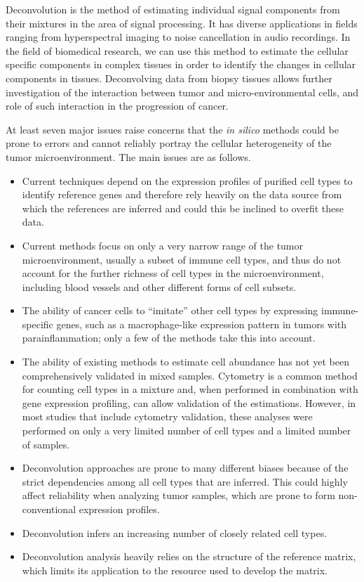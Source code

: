 \documentclass{article}
\begin{document}
Deconvolution is the method of estimating individual signal components from their mixtures in the area of signal processing. It has diverse applications in fields ranging from hyperspectral imaging to noise cancellation in audio recordings. In the field of biomedical research, we can use this method to estimate the cellular specific components in complex tissues in order to identify the changes in cellular components in tissues. Deconvolving data from biopsy tissues allows further investigation of the interaction between tumor and micro-environmental cells, and role of such interaction in the progression of cancer.

At least seven major issues raise concerns that the \textit{in silico} methods could be prone to errors and cannot reliably portray the cellular heterogeneity of the tumor microenvironment. The main issues are as follows.
\begin{itemize}
    \item Current techniques depend on the expression profiles of purified cell types to identify reference genes and therefore rely heavily on the data source from which the references are inferred and could this be inclined to overfit these data. 
     \item Current methods focus on only a very narrow range of the tumor microenvironment, usually a subset of immune cell types, and thus do not account for the further richness of cell types in the microenvironment, including blood vessels and other different forms of cell subsets.
      \item The ability of cancer cells to “imitate” other cell types by expressing immune-specific genes, such as a macrophage-like expression pattern in tumors with parainflammation; only a few of the methods take this into account. 
       \item The ability of existing methods to estimate cell abundance has not yet been comprehensively validated in mixed samples. Cytometry is a common method for counting cell types in a mixture and, when performed in combination with gene expression profiling, can allow validation of the estimations. However, in most studies that include cytometry validation, these analyses were performed on only a very limited number of cell types and a limited number of samples. 
        \item Deconvolution approaches are prone to many different biases because of the strict dependencies among all cell types that are inferred. This could highly affect reliability when analyzing tumor samples, which are prone to form non-conventional expression profiles. 
         \item Deconvolution infers an increasing number of closely related cell types.
          \item Deconvolution analysis heavily relies on the structure of the reference matrix, which limits its application to the resource used to develop the matrix.
\end{itemize}
\end{document}
